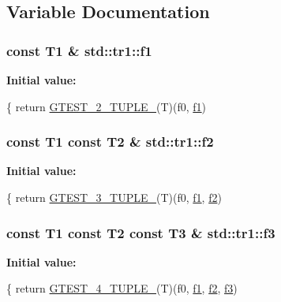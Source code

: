 \subsection{Variable Documentation}
\hypertarget{namespacestd_1_1tr1_a9c0fa65b105f8e2f58ba59ecf75fd000}{
\subsubsection[{f1}]{\setlength{\rightskip}{0pt plus 5cm}const T1 \& std\-::tr1\-::f1}}\label{namespacestd_1_1tr1_a9c0fa65b105f8e2f58ba59ecf75fd000}
{\bfseries Initial value\-:}
\begin{DoxyCode}
\{
  \textcolor{keywordflow}{return} \hyperlink{fused-src_2gtest_2gtest_8h_a93229c3f009273c73eca237b4d19f326}{GTEST\_2\_TUPLE\_}(T)(f0, \hyperlink{namespacestd_1_1tr1_a9c0fa65b105f8e2f58ba59ecf75fd000}{f1})
\end{DoxyCode}
\hypertarget{namespacestd_1_1tr1_a87dd9e009868361317f587126dba63d4}{
\subsubsection[{f2}]{\setlength{\rightskip}{0pt plus 5cm}const T1 const T2 \& std\-::tr1\-::f2}}\label{namespacestd_1_1tr1_a87dd9e009868361317f587126dba63d4}
{\bfseries Initial value\-:}
\begin{DoxyCode}
\{
  \textcolor{keywordflow}{return} \hyperlink{fused-src_2gtest_2gtest_8h_af2c3eab3f1a5197b408fce44eb3ed9da}{GTEST\_3\_TUPLE\_}(T)(f0, \hyperlink{namespacestd_1_1tr1_a9c0fa65b105f8e2f58ba59ecf75fd000}{f1}, \hyperlink{namespacestd_1_1tr1_a87dd9e009868361317f587126dba63d4}{f2})
\end{DoxyCode}
\hypertarget{namespacestd_1_1tr1_a0f7c3b47d27d42d82d1a333ea420ce4e}{
\subsubsection[{f3}]{\setlength{\rightskip}{0pt plus 5cm}const T1 const T2 const T3 \& std\-::tr1\-::f3}}\label{namespacestd_1_1tr1_a0f7c3b47d27d42d82d1a333ea420ce4e}
{\bfseries Initial value\-:}
\begin{DoxyCode}
\{
  \textcolor{keywordflow}{return} \hyperlink{fused-src_2gtest_2gtest_8h_a3625feb24d5e6eb9926fd558e4a2e3ff}{GTEST\_4\_TUPLE\_}(T)(f0, \hyperlink{namespacestd_1_1tr1_a9c0fa65b105f8e2f58ba59ecf75fd000}{f1}, \hyperlink{namespacestd_1_1tr1_a87dd9e009868361317f587126dba63d4}{f2}, \hyperlink{namespacestd_1_1tr1_a0f7c3b47d27d42d82d1a333ea420ce4e}{f3})
\end{DoxyCode}
